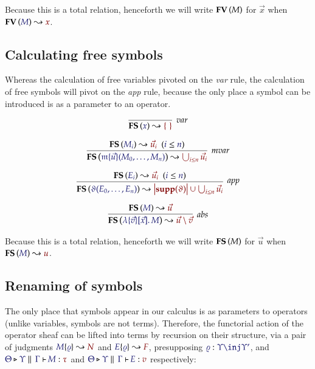 \documentclass[11pt]{article}
\theoremstyle{definition}
\theoremstyle{remark}
\numberwithin{equation}{section}
\newcommand\Supp[1]{\mathbf{supp}(#1)}
\newcommand\CalcFV[2]{
  \FV{\IMode{#1}}\leadsto \OMode{#2}
}
\newcommand\CalcFS[2]{
  \FS{\IMode{#1}}\leadsto \OMode{#2}
}
\begin{document}
Because this is a total relation, henceforth we will write $\mathbf{FV}\left(M\right)$ for
$\vec{x}$ when $\CalcFV{M}{x}$.

\subsection{Calculating free symbols}

Whereas the calculation of free variables pivoted on the \emph{var} rule, the
calculation of free symbols will pivot on the \emph{app} rule, because the only
place a symbol can be introduced is as a parameter to an operator.

\begin{gather*}
  \infer[\textit{var}]{
    \CalcFS{x}{\MkSet{}}
  }{
  }\\[6pt]
  \infer[\textit{mvar}]{
    \CalcFS{
      \MApp{\MV{m}}{\vec{u}}{M_0,\dots,M_n}
    }{
      \bigcup_{i\leq n} \vec{u}_i
    }
  }{
    \HypJ{
      \CalcFS{M_i}{\vec{u}_i}
    }{
      \Leq{i}{n}
    }
  }\\[6pt]
  \infer[\textit{app}]{
    \CalcFS{
      \App{\vartheta}{E_0,\dots,E_n}
    }{
      \Dom{\Supp{\vartheta}} \cup \bigcup_{i\leq n} \vec{u}_i
    }
  }{
    \HypJ{
      \CalcFS{E_i}{\vec{u}_i}
    }{
      \Leq{i}{n}
    }
  }\\[6pt]
  \infer[\textit{abs}]{
    \CalcFS{
      \MkBTm{\vec{v}}{\vec{x}}{M}
    }{
      \vec{u}\setminus\vec{v}
    }
  }{
    \CalcFS{M}{\vec{u}}
  }
\end{gather*}

Because this is a total relation, henceforth we will write $\mathbf{FS}\left(M\right)$ for
$\vec{u}$ when $\CalcFS{M}{u}$.


\subsection{Renaming of symbols}

The only place that symbols appear in our calculus is as parameters to operators
(unlike variables, symbols are not terms). Therefore, the functorial action of
the operator sheaf can be lifted into terms by recursion on their
structure, via a pair of judgments $\IsRenaming{\varrho}{M}{N}$ and
$\IsRenaming{\varrho}{E}{F}$, presupposing $\Of{\varrho}{\Upsilon\inj\Upsilon'}$,
and $\IsAbt{\Theta}{\Upsilon}{\Gamma}{M}{\tau}$ and
$\IsAbt{\Theta}{\Upsilon}{\Gamma}{E}{v}$ respectively:
\end{document}
